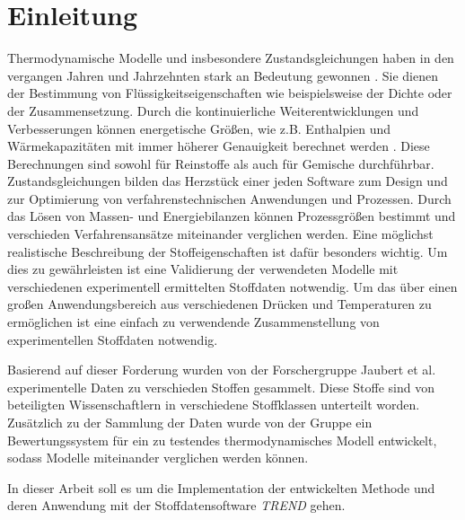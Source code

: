 \documentclass[../thesis.tex]{subfiles}
\begin{document}
\chapter{Einleitung}
\label{chp:Motivation}
Thermodynamische Modelle und insbesondere Zustandsgleichungen haben in den vergangen Jahren und Jahrzehnten stark an Bedeutung gewonnen \cite{ahlers2002development, stacey2000k}. Sie dienen der Bestimmung von Flüssigkeitseigenschaften wie beispielsweise der Dichte oder der Zusammensetzung. Durch die kontinuierliche Weiterentwicklungen und Verbesserungen können energetische Größen, wie z.B. Enthalpien und Wärmekapazitäten mit immer höherer Genauigkeit berechnet werden \cite{chen2002modification}. Diese Berechnungen sind sowohl für Reinstoffe als auch für Gemische durchführbar.
Zustandsgleichungen bilden das Herzstück einer jeden Software zum Design und zur Optimierung von verfahrenstechnischen Anwendungen und Prozessen. Durch das Lösen von Massen- und Energiebilanzen können Prozessgrößen bestimmt und verschieden Verfahrensansätze miteinander verglichen werden. Eine möglichst realistische Beschreibung der Stoffeigenschaften ist dafür besonders wichtig. Um dies zu gewährleisten ist eine Validierung der verwendeten Modelle mit verschiedenen experimentell ermittelten Stoffdaten notwendig. Um das über einen großen Anwendungsbereich aus verschiedenen Drücken und Temperaturen zu ermöglichen ist eine einfach zu verwendende Zusammenstellung von experimentellen Stoffdaten notwendig.

Basierend auf dieser Forderung wurden von der Forschergruppe Jaubert et al. \cite{jaubert2020benchmark} experimentelle Daten zu verschieden Stoffen gesammelt. Diese Stoffe sind von beteiligten Wissenschaftlern in verschiedene Stoffklassen unterteilt worden. Zusätzlich zu der Sammlung der Daten wurde von der Gruppe ein Bewertungssystem für ein zu testendes thermodynamisches Modell entwickelt, sodass Modelle miteinander verglichen werden können.

In dieser Arbeit soll es um die Implementation der entwickelten Methode und deren Anwendung mit der Stoffdatensoftware \textit{TREND} gehen.
\end{document}
